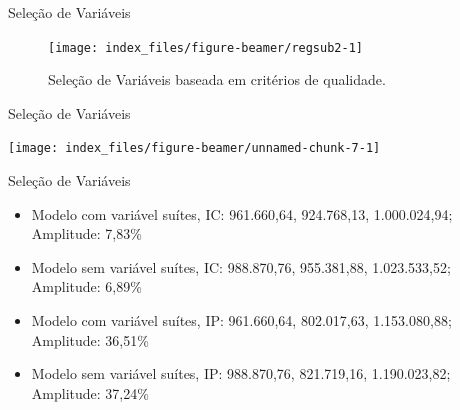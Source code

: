 \documentclass[9pt,ignorenonframetext,aspectratio=169]{beamer}
\providecommand{\tightlist}{%
  \setlength{\itemsep}{0pt}\setlength{\parskip}{0pt}}
\begin{document}
\begin{frame}{Seleção de Variáveis}
\protect\hypertarget{seleuxe7uxe3o-de-variuxe1veis-1}{}

\begin{figure}

{\centering \texttt{[image: index\_files/figure-beamer/regsub2-1]} 

}

\caption{Seleção de Variáveis baseada em critérios de qualidade.}\label{fig:regsub2}
\end{figure}

\end{frame}

\begin{frame}{Seleção de Variáveis}
\protect\hypertarget{seleuxe7uxe3o-de-variuxe1veis-2}{}

\begin{center}\texttt{[image: index\_files/figure-beamer/unnamed-chunk-7-1]} \end{center}

\end{frame}

\begin{frame}{Seleção de Variáveis}
\protect\hypertarget{seleuxe7uxe3o-de-variuxe1veis-3}{}

\begin{itemize}[<+->]
\tightlist
\item
  Modelo com variável suítes, IC: 961.660,64, 924.768,13, 1.000.024,94;
  Amplitude: 7,83\%
\item
  Modelo sem variável suítes, IC: 988.870,76, 955.381,88, 1.023.533,52;
  Amplitude: 6,89\%
\item
  Modelo com variável suítes, IP: 961.660,64, 802.017,63, 1.153.080,88;
  Amplitude: 36,51\%
\item
  Modelo sem variável suítes, IP: 988.870,76, 821.719,16, 1.190.023,82;
  Amplitude: 37,24\%
\end{itemize}

\end{frame}
\end{document}
